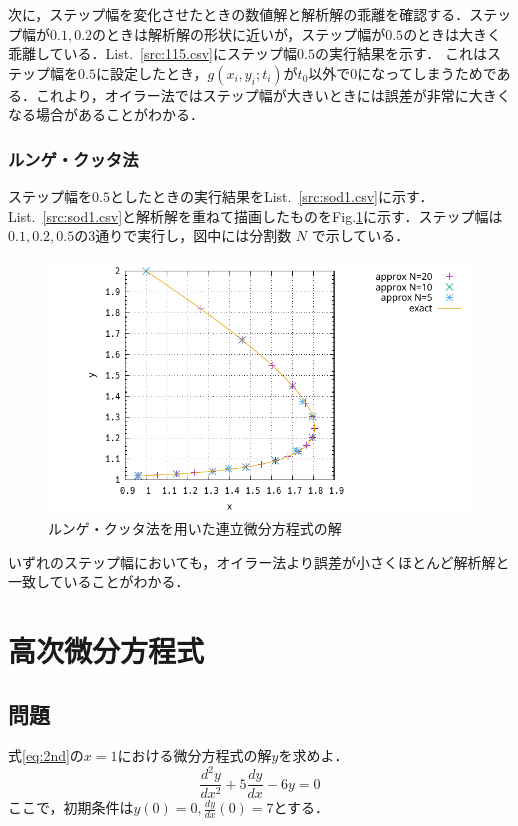 \documentclass[gutter=20mm,fore-edge=20mm,head_space=30mm,foot_space=30mm]{jlreq}
\begin{document}
次に，ステップ幅を変化させたときの数値解と解析解の乖離を確認する．ステップ幅が$0.1, 0.2$のときは解析解の形状に近いが，ステップ幅が$0.5$のときは大きく乖離している．List.~\ref{src:115.csv}にステップ幅$0.5$の実行結果を示す．
これはステップ幅を$0.5$に設定したとき，$g(x_i, y_i; t_i)$が$t_0$以外で$0$になってしまうためである．これより，オイラー法ではステップ幅が大きいときには誤差が非常に大きくなる場合があることがわかる．

\subsubsection{ルンゲ・クッタ法}
ステップ幅を$0.5$としたときの実行結果をList.~\ref{src:sod1.csv}に示す．
List.~\ref{src:sod1.csv}と解析解を重ねて描画したものをFig.\ref{fig:sod1}に示す．ステップ幅は$0.1, 0.2, 0.5$の3通りで実行し，図中には分割数 $N$ で示している．
\begin{figure}[H]
  \centering
  \includegraphics[width=0.8\linewidth]{1-2.pdf} %
  \caption{ルンゲ・クッタ法を用いた連立微分方程式の解}
  \label{fig:sod1}
\end{figure}
いずれのステップ幅においても，オイラー法より誤差が小さくほとんど解析解と一致していることがわかる．

\section{高次微分方程式}
\subsection{問題}
式\ref{eq:2nd}の$x=1$における微分方程式の解$y$を求めよ．
\begin{equation}
  \frac{d^2y}{dx^2} + 5\frac{dy}{dx} - 6y = 0 \label{eq:2nd}
\end{equation}
ここで，初期条件は$\displaystyle y(0) = 0, \frac{dy}{dx}(0) = 7$とする．
\end{document}
